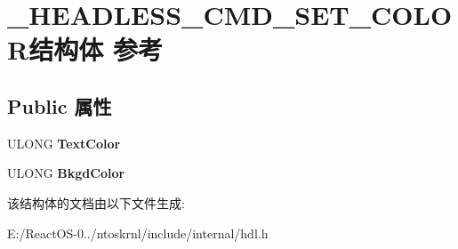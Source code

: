 \hypertarget{struct___h_e_a_d_l_e_s_s___c_m_d___s_e_t___c_o_l_o_r}{}\section{\+\_\+\+H\+E\+A\+D\+L\+E\+S\+S\+\_\+\+C\+M\+D\+\_\+\+S\+E\+T\+\_\+\+C\+O\+L\+O\+R结构体 参考}
\label{struct___h_e_a_d_l_e_s_s___c_m_d___s_e_t___c_o_l_o_r}
\subsection*{Public 属性}
\begin{DoxyCompactItemize}
\item 
\mbox{\label{struct___h_e_a_d_l_e_s_s___c_m_d___s_e_t___c_o_l_o_r_ab9ccbf61229e8f1d557acceb33fedd60}} 
U\+L\+O\+NG {\bfseries Text\+Color}
\item 
\mbox{\label{struct___h_e_a_d_l_e_s_s___c_m_d___s_e_t___c_o_l_o_r_a2a48de192e0d220b08e30c0d00d799b6}} 
U\+L\+O\+NG {\bfseries Bkgd\+Color}
\end{DoxyCompactItemize}


该结构体的文档由以下文件生成\+:\begin{DoxyCompactItemize}
\item 
E\+:/\+React\+O\+S-\/0../ntoskrnl/include/internal/hdl.\+h\end{DoxyCompactItemize}

